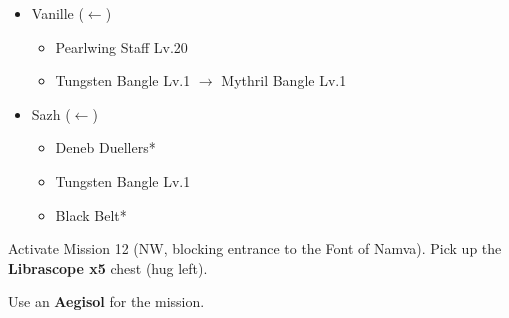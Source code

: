 \begin{menu}
\begin{itemize}
\begin{itemize}
\begin{itemize}
				\end{itemize}
			\item Vanille ($\leftarrow$)
			      \begin{itemize}
				      \item Pearlwing Staff Lv.20
				      \item Tungsten Bangle Lv.1 $\rightarrow$ Mythril Bangle Lv.1
			      \end{itemize}
			\item Sazh ($\leftarrow$)
			      \begin{itemize}
				      \item Deneb Duellers*
				      \item Tungsten Bangle Lv.1
				      \item Black Belt*
			      \end{itemize}
		\end{itemize}
	\end{itemize}
\end{menu}

\renewcommand{\first}{[1] Hero's Charge (\syn/\med/\com)}
\renewcommand{\second}{[2] Tri-Disaster (\rav/\rav/\rav)}
\renewcommand{\third}{[3] Hero's Charge (\syn/\med/\com)}
\renewcommand{\fourth}{[4] Guerilla (\syn/\sab/\rav)}
\renewcommand{\fifth}{[5] Aggression (\com/\rav/\com)}
\renewcommand{\sixth}{[6] Relentless Assault (\rav/\rav/\com)}

Activate Mission 12 (NW, blocking entrance to the Font of Namva).
Pick up the \textbf{Librascope x5} chest (hug left).

Use an \textbf{Aegisol} for the mission.

